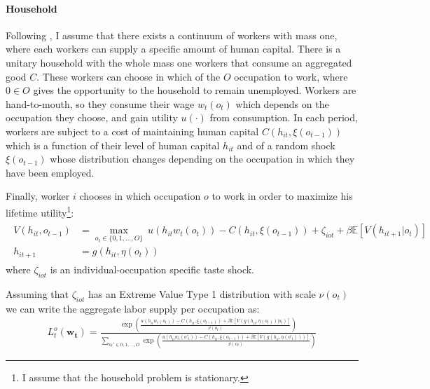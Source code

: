 \documentclass[english,letter,11pt,twoside]{article}
\begin{document}
\paragraph*{Household}
Following \cite{grigsby2022skill}, I assume that there exists a continuum of workers with mass one, where each workers can supply a specific amount of human capital. There is a unitary household with the whole mass one workers that consume an aggregated good $C$. These workers can choose in which of the $O$ occupation to work, where $0\in O$ gives the opportunity to the household to remain unemployed. Workers are hand-to-mouth, so they consume their wage $w_t (o_t)$ which depends on the occupation they choose, and gain utility $u(\cdot)$ from consumption. In each period, workers are subject to a cost of maintaining human capital $C\left( h_{it}, \xi \left( o_{t-1} \right) \right)$ which is a function of their level of human capital $h_{it}$ and of a random shock $\xi \left( o_{t-1} \right)$ whose distribution changes depending on the occupation in which they have been employed.


Finally, worker $i$ chooses in which occupation $o$ to work in order to maximize his lifetime utility\footnote{I assume that the household problem is stationary.}:
\begin{align}
\begin{split}
  V(h_{it},o_{t-1}) &= \max\limits_{o_t \in \{0,1,\ldots,O\}} \ u\left( h_{it} w_t (o_t) \right) - C\left( h_{it}, \xi \left( o_{t-1} \right) \right) + \zeta_{iot} + \beta \mathbb{E} \left[ V\left(h_{it+1} | o_t \right) \right] \\
  h_{it+1} &= g \left( h_{it},\eta(o_t) \right)
\end{split}
\end{align}
where $\zeta_{iot}$ is an individual-occupation specific taste shock.

Assuming that $\zeta_{iot}$ has an Extreme Value Type 1 distribution with scale $\nu \left( o_t \right)$ we can write the aggregate labor supply per occupation as:
\begin{align}
L^{o}_t\left( \mathbf{w_t} \right) = \frac{\exp\left( \frac{ u\left( h_{it} w_t (o_t) \right) - C\left( h_{it}, \xi \left( o_{t-1} \right) \right) +  \beta \mathbb{E} \left[ V\left(g \left( h_{it},\eta(o_t) \right) | o_t \right) \right]  }{\nu \left(o_t \right)}\right)}{\sum_{o_t' \in {0,1,\ldots,O}} \exp\left( \frac{ u\left( h_{it} w_t (o'_t) \right) - C\left( h_{it},\xi \left( o_{t-1} \right)  \right) + \beta \mathbb{E} \left[ V\left(g \left( h_{it},\eta(o'_t) \right)  \right) \right]   }{\nu \left(o_t \right) }\right)}
\end{align}
\end{document}
